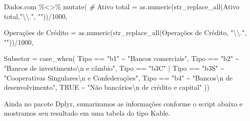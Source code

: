 \documentclass[
]{article}
\newenvironment{Shaded}{\begin{snugshade}}{\end{snugshade}}
\newcommand{\AttributeTok}[1]{\textcolor[rgb]{0.77,0.63,0.00}{#1}}
\newcommand{\CommentTok}[1]{\textcolor[rgb]{0.56,0.35,0.01}{\textit{#1}}}
\newcommand{\ConstantTok}[1]{\textcolor[rgb]{0.00,0.00,0.00}{#1}}
\newcommand{\DecValTok}[1]{\textcolor[rgb]{0.00,0.00,0.81}{#1}}
\newcommand{\FunctionTok}[1]{\textcolor[rgb]{0.00,0.00,0.00}{#1}}
\newcommand{\NormalTok}[1]{#1}
\newcommand{\OtherTok}[1]{\textcolor[rgb]{0.56,0.35,0.01}{#1}}
\newcommand{\SpecialCharTok}[1]{\textcolor[rgb]{0.00,0.00,0.00}{#1}}
\newcommand{\StringTok}[1]{\textcolor[rgb]{0.31,0.60,0.02}{#1}}
\begin{document}
\begin{Shaded}
\begin{Highlighting}[]
\NormalTok{Dados.com }\SpecialCharTok{\%\textless{}\textgreater{}\%} \FunctionTok{mutate}\NormalTok{( }\CommentTok{\# }
  \StringTok{\textasciigrave{}}\AttributeTok{Ativo total}\StringTok{\textasciigrave{}} \OtherTok{=} 
    \FunctionTok{as.numeric}\NormalTok{(}\FunctionTok{str\_replace\_all}\NormalTok{(}\StringTok{\textasciigrave{}}\AttributeTok{Ativo total}\StringTok{\textasciigrave{}}\NormalTok{,}\StringTok{"}\SpecialCharTok{\textbackslash{}\textbackslash{}}\StringTok{."}\NormalTok{, }\StringTok{""}\NormalTok{))}\SpecialCharTok{/}\DecValTok{1000}\NormalTok{,}
  
  \StringTok{\textasciigrave{}}\AttributeTok{Operações de Crédito}\StringTok{\textasciigrave{}} \OtherTok{=} 
    \FunctionTok{as.numeric}\NormalTok{(}\FunctionTok{str\_replace\_all}\NormalTok{(}\StringTok{\textasciigrave{}}\AttributeTok{Operações de Crédito}\StringTok{\textasciigrave{}}\NormalTok{, }\StringTok{"}\SpecialCharTok{\textbackslash{}\textbackslash{}}\StringTok{."}\NormalTok{, }\StringTok{""}\NormalTok{))}\SpecialCharTok{/}\DecValTok{1000}\NormalTok{,}
  
   \AttributeTok{Subsetor =} \FunctionTok{case\_when}\NormalTok{(}
\NormalTok{              Tipo }\SpecialCharTok{==} \StringTok{"b1"} \SpecialCharTok{\textasciitilde{}} \StringTok{"Bancos comerciais"}\NormalTok{,}
\NormalTok{              Tipo }\SpecialCharTok{==} \StringTok{"b2"} \SpecialCharTok{\textasciitilde{}} \StringTok{"Bancos de investimento}\SpecialCharTok{\textbackslash{}n}\StringTok{ e câmbio"}\NormalTok{,}
\NormalTok{              Tipo }\SpecialCharTok{==} \StringTok{"b3C"} \SpecialCharTok{|} 
\NormalTok{              Tipo }\SpecialCharTok{==} \StringTok{"b3S"} \SpecialCharTok{\textasciitilde{}} \StringTok{"Cooperativas Singulares}\SpecialCharTok{\textbackslash{}n}\StringTok{ e Confederações"}\NormalTok{,}
\NormalTok{              Tipo }\SpecialCharTok{==} \StringTok{"b4"} \SpecialCharTok{\textasciitilde{}} \StringTok{"Bancos}\SpecialCharTok{\textbackslash{}n}\StringTok{ de desenvolvimento"}\NormalTok{,}
              \ConstantTok{TRUE} \SpecialCharTok{\textasciitilde{}} \StringTok{"Não bancários}\SpecialCharTok{\textbackslash{}n}\StringTok{ de crédito e capital"}
\NormalTok{                      ))}
\end{Highlighting}
\end{Shaded}

Ainda no pacote Dplyr, sumarizamos as informações conforme o script
abaixo e mostramos seu resultado em uma tabela do tipo Kable.
\end{document}
